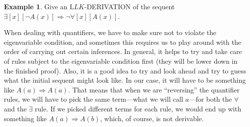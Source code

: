 \documentclass[10pt,a4paper]{article}
\newcommand*{\olup}[1]{\MakeUppercase{#1}}
\theoremstyle{plain}
\theoremstyle{definition}
\newtheorem{ex}[thm]{Example}
\theoremstyle{remark}
\providecommand{\lforall}{\mathord{\forall}}
\providecommand{\lexists}{\mathord{\exists}}
\providecommand{\Sequent}{\mathrel{\Rightarrow}}
\providecommand{\Log}{\ensuremath{\mathrm{L}}}
\begin{document}
\begin{ex}
Give an $\Log{LK}$-\olup{derivation} of the sequent $\lexists[x][\lnot A(x)]
\Sequent \lnot \lforall[x][A(x)]$.

When dealing with quantifiers, we have to make sure not to violate the
eigenvariable condition, and sometimes this requires us to play around
with the order of carrying out certain inferences. In general, it
helps to try and take care of rules subject to the eigenvariable
condition first (they will be lower down in the finished proof). Also,
it is a good idea to try and look ahead and try to guess what the
initial sequent might look like. In our case, it will have to be
something like $A(a) \Sequent A(a)$. That means that when we are
``reversing'' the quantifier rules, we will have to pick the same
term---what we will call $a$---for both the $\lforall$ and the
$\lexists$ rule. If we picked different terms for each rule, we would
end up with something like $A(a) \Sequent A(b)$, which, of course,
is not derivable.


\end{ex}
\end{document}
